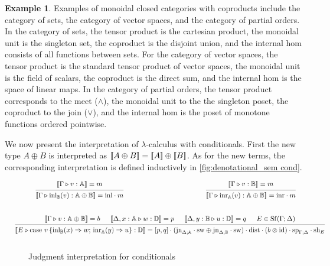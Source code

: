 \documentclass[10pt,a4paper]{amsart}
\theoremstyle{definition}
\theoremstyle{definition}
\newtheorem{example}[definition]{Example}
\theoremstyle{definition}
\theoremstyle{definition}
\theoremstyle{definition}
\theoremstyle{definition}
\begin{document}
\begin{example}
Examples of monoidal closed categories with coproducts include the category of sets, the category of vector spaces, and the category of partial orders. In the category of sets, the tensor product is the cartesian product, the monoidal unit is the singleton set, the coproduct is the disjoint union, and the internal hom consists of all functions between sets. For the category of vector spaces, the tensor product is the standard tensor product of vector spaces, the monoidal unit is the field of scalars, the coproduct is the direct sum, and the internal hom is the space of linear maps. In the category of partial orders, the tensor product corresponds to the meet ($\wedge$), the monoidal unit to the the singleton poset, the coproduct to the join ($\vee$), and the internal hom is the poset of monotone functions ordered pointwise.
\end{example}

We now present the interpretation of $\lambda$-calculus with conditionals.
First the new type $A \oplus B$ is interpreted as $\left \llbracket A \oplus B \right \rrbracket = [\![A
]\!] \oplus [\![ B ]\!]$. As for the new terms, the corresponding
interpretation is defined inductively in \autoref{fig:denotational_sem cond}.

\begin{figure}[H]
  \begin{equation*}
  \begin{aligned}
  &\hspace{10pt}
  \begin{prooftree}
      \hypo{ [\![\Gamma \vljud v: \typeA]\!] = m }
      \infer1[]{ [\![ \Gamma \vljud \text{inl}_{\typeB} (v):  \typeA \oplus \typeB  ]\!] = \inl  \comp m}
  \end{prooftree}
  \hspace{120pt}
  \begin{prooftree}
    \hypo{ [\![\Gamma \vljud v: \typeB]\!] = m }
    \infer1[]{ [\![ \Gamma \vljud \text{inr}_{\typeA} (v):  \typeA \oplus \typeB  ]\!] = \inr  \comp m}
\end{prooftree}
  \\[20pt]
  &\hspace{-20pt}
  \begin{prooftree}
      \hypo{[\![\Gamma\vljud v: \typeA \oplus \typeB ]\!] = b}
      \hypo{[\![\Delta, x:\typeA \vljud w: \typeD ]\!] = p}
      \hypo{ [\![\Delta,y:\typeB \vljud u: \typeD ]\!] = q }
      \hypo{E \in \Shuff(\Gamma; \Delta)}
      \infer4[]{ [\![E \vljud \text{case } v\,  \{\text{inl}_{\typeB} (x) \Rightarrow w ;\, \text{inr}_{\typeA} (y) \Rightarrow u\}: \typeD ]\!] =   [p,q] \comp (\text{jn}_{\Delta;\typeA}\comp \sw \oplus \text{jn}_{\Delta;\typeB}\comp \sw) \comp \dist \comp (b \otimes \text{id}) \comp \text{sp}_{\Gamma;\Delta} \comp \text{sh}_{E}}
  \end{prooftree}
  \\[10pt]
  \end{aligned}
  \end{equation*}
  \caption{Judgment interpretation for conditionals}
\label{fig:denotational_sem cond}
\end{figure}
\end{document}
